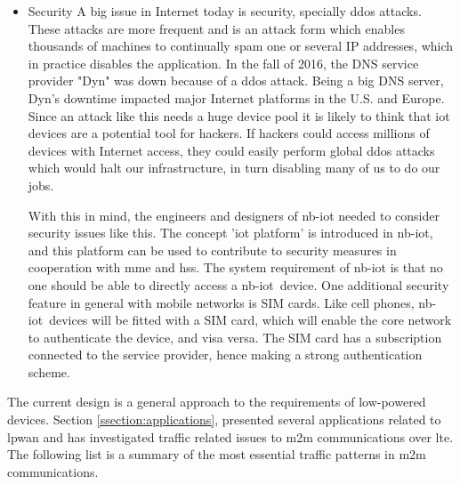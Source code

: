 \documentclass[USenglish]{ifimaster}  %
\begin{document}
\begin{itemize}
  \item Security \newline
  A big issue in Internet today is security, specially \acrshort{ddos} attacks. These attacks are more frequent and is an attack form which enables thousands of machines to continually spam one or several IP addresses, which in practice disables the application. In the fall of 2016, the DNS service provider "Dyn" was down because of a \acrshort{ddos} attack. Being a big DNS server, Dyn's downtime impacted major Internet platforms in the U.S. and Europe\cite{online:ddosAttack}. Since an attack like this needs a huge device pool it is likely to think that \acrshort{iot} devices are a potential tool for hackers. If hackers could access millions of devices with Internet access, they could easily perform global \acrshort{ddos} attacks which would halt our infrastructure, in turn disabling many of us to do our jobs.

  With this in mind, the engineers and designers of \acrshort{nb-iot} needed to consider security issues like this. The concept '\acrshort{iot} platform' is introduced in \acrshort{nb-iot}, and this platform can be used to contribute to security measures in cooperation with \acrshort{mme} and \acrshort{hss}. The system requirement of \acrshort{nb-iot} is that no one should be able to directly access a \acrshort{nb-iot} device. One additional security feature in general with mobile networks is SIM cards. Like cell phones, \acrshort{nb-iot} devices will be fitted with a SIM card, which will enable the core network to authenticate the device, and visa versa. The SIM card has a subscription connected to the service provider, hence making a strong authentication scheme.
\end{itemize}

The current design is a general approach to the requirements of low-powered devices. Section \vref{ssection:applications}, presented several applications related to \acrshort{lpwan} and \cite{ASurveyo24:online} has investigated traffic related issues to \acrshort{m2m} communications over \acrshort{lte}. The following list is a summary of the most essential traffic patterns in \acrshort{m2m} communications\cite{ASurveyo24:online}.
\end{document}
